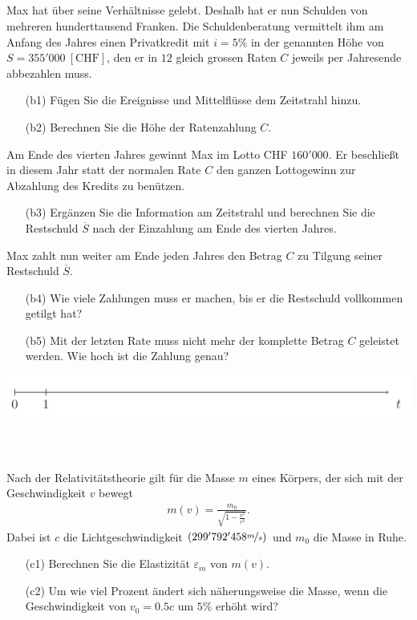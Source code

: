 \subsection*{}
Max hat über seine Verhältnisse gelebt. 
Deshalb hat er nun Schulden von mehreren hunderttausend Franken.
Die Schuldenberatung vermittelt ihm am Anfang des Jahres einen Privatkredit mit $ i = 5 \% $ in der genannten Höhe von $ S = 355'000 \ [\textrm{CHF}] $, den er in $ 12 $ gleich grossen Raten $ C $ jeweils per Jahresende abbezahlen muss. 
\begin{enumerate}
	\item[(b1)] Fügen Sie die Ereignisse und Mittelflüsse dem Zeitstrahl hinzu.
	\item[(b2)] Berechnen Sie die Höhe der Ratenzahlung $ C $.
\end{enumerate}
Am Ende des vierten Jahres gewinnt Max im Lotto CHF $ 160'000 $.
Er beschließt in diesem Jahr statt der normalen Rate $ C $ den ganzen Lottogewinn zur Abzahlung des Kredits zu benützen.
\begin{enumerate}
	\item[(b3)] Ergänzen Sie die Information am Zeitstrahl und berechnen Sie die Restschuld $ \overline{S} $ nach der Einzahlung am Ende des vierten Jahres.
\end{enumerate}
Max zahlt nun weiter am Ende jeden Jahres den Betrag $ C $ zu Tilgung seiner Restschuld $ \overline{S} $.
\begin{enumerate}
	\item[(b4)] Wie viele Zahlungen muss er machen, bis er die Restschuld vollkommen getilgt hat?
	\item[(b5)] Mit der letzten Rate muss nicht mehr der komplette Betrag $ C $ geleistet werden. Wie hoch ist die Zahlung genau?
\end{enumerate}
\begin{center}
	\includegraphics[scale=0.3]{pictures/zeitstrahl_1_b}
\end{center}
\ \\
\subsection*{}
Nach der Relativitätstheorie gilt für die Masse $ m $ eines Körpers, der sich mit der Geschwindigkeit $ v $ bewegt
\begin{align*}
	m(v)
	=
	\frac{m_0}{\sqrt{1 - \frac{v^2}{c^2}}}.
\end{align*}
Dabei ist $ c $ die Lichtgeschwindigkeit $ (299'792'458 \nicefrac{m}{s}) $ und $ m_0 $ die Masse in Ruhe.
\begin{enumerate}
	\item[(c1)] Berechnen Sie die Elastizität $ \varepsilon_m $ von $ m(v) $.
	\item[(c2)] Um wie viel Prozent ändert sich näherungsweise die Masse, wenn die Geschwindigkeit von $ v_0 = 0.5c $ um $ 5 \% $ erhöht wird?
\end{enumerate}
\
\\
